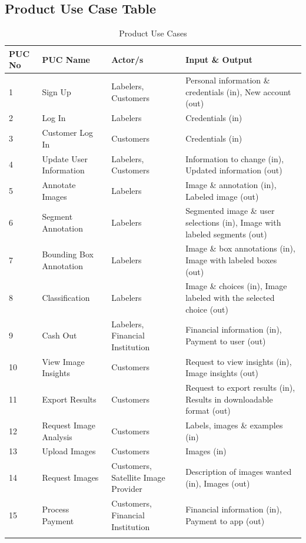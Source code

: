 \documentclass[12pt]{article}
\begin{document}
\subsection{Product Use Case Table}
\begin{longtable}
 {p{} | p{} | p{} | p{}}
  \toprule
  \textbf{PUC No} & \textbf{PUC Name} & \textbf{Actor/s} & \textbf{Input \& Output}\\
  \midrule
  1 & Sign Up & Labelers, Customers & Personal information \& credentials (in), New account (out)\\
  \midrule
  2 & Log In & Labelers & Credentials (in)\\
  \midrule
  3 & Customer Log In & Customers & Credentials (in)\\
  \midrule
  4 & Update User Information & Labelers, Customers & Information to change (in),  Updated information (out)\\
   \midrule
  5 & Annotate Images & Labelers & Image \& annotation (in), Labeled image (out)\\
  \midrule
  6 & Segment Annotation & Labelers & Segmented image \& user selections (in), Image with labeled segments (out)\\
  \midrule
  7 & Bounding Box Annotation & Labelers & Image \& box annotations (in), Image with labeled boxes (out)\\
  \midrule
  8 & Classification & Labelers & Image \& choices (in), Image labeled with the selected choice (out)\\
  \midrule
   9 & Cash Out & Labelers, Financial Institution & Financial information (in), Payment to user (out)\\
  \midrule
  10 & View Image Insights & Customers & Request to view insights (in), Image insights (out)\\
  \midrule
  11 & Export Results & Customers & Request to export results (in), Results in downloadable format (out)\\
  \midrule
  12 & Request Image Analysis & Customers & Labels, images \& examples (in) \\
  \midrule
  13 & Upload Images & Customers & Images (in)\\
  \midrule
  14 & Request Images & Customers, Satellite Image Provider & Description of images wanted (in), Images (out)\\
  \midrule
  15 & Process Payment & Customers, Financial Institution & Financial information (in), Payment to app (out)\\
  \bottomrule
  \caption{Product Use Cases} \label{TblPUC}\\
\end{longtable}
\end{document}
